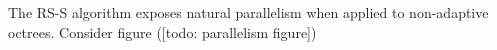 The RS-S algorithm exposes natural parallelism when applied to non-adaptive octrees. Consider figure ([todo: parallelism figure])












